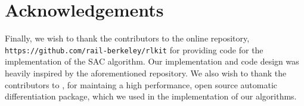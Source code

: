 \documentclass{report}
\numberwithin{equation}{section}
\numberwithin{figure}{section}
\numberwithin{table}{section}
\numberwithin{algorithm}{section}
\begin{document}
\section{Acknowledgements}

Finally, we wish to thank the contributors to 
the online repository, \verb|https://github.com/rail-berkeley/rlkit| 
for providing code for the implementation of the SAC algorithm. 
Our implementation and code design was heavily inspired by the aforementioned
repository. We also wish to thank the contributors to 
\cite{PyTorch}, for maintaing a high performance, open source 
automatic differentiation package, which we used in the 
implementation of our algorithms.



\end{document}

